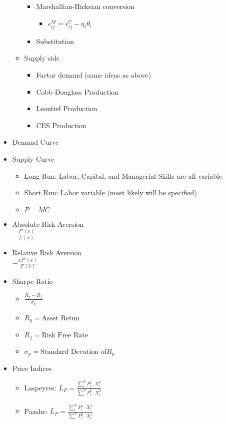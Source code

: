\begin{itemize}
\begin{itemize}
\begin{itemize}
\begin{itemize}
			\end{itemize}
			\item Marshallian-Hicksian conversion
			\begin{itemize}
				\item $\epsilon^M_{ij} = \epsilon^C_{ij} - \eta_i\theta_i$
			\end{itemize}
			\item Substitution
		\end{itemize}
		\item Supply side
		\begin{itemize}
			\item Factor demand (same ideas as above)
			\item Cobb-Douglass Production
			\item Leontief Production
			\item CES Production
		\end{itemize}
	\end{itemize}
	\item Demand Curve
	\item Supply Curve
	\begin{itemize}
		\item Long Run: Labor, Capital, and Managerial Skills are all variable
		\item Short Run: Labor variable (most likely will be specified)		
		\item $P = MC$
	\end{itemize}
		\item Absolute Risk Aversion\\
		$-\frac{f''(x)}{f'(x)}$
		\item Relative Risk Aversion\\
		$-\frac{xf''(x)}{f'(x)}$
		\item Sharpe Ratio
	\begin{itemize}
		\item $\frac{R_p - R_f}{\sigma_p}$
		\item $R_p = \text{Asset Retun}$
		\item $R_f = \text{Risk Free Rate}$
		\item $\sigma_p = \text{Standard Devation of} R_p$
	\end{itemize}
	\item Price Indices
	\begin{itemize}
		\item Laspeyres: $L_P = \frac{\sum_i^N P_i^1\cdot X_i^0}{\sum_i^N P_i^0\cdot X_i^0}$
		\item Paashe: $L_P = \frac{\sum_i^N P_i^1\cdot X_i^1}{\sum_i^N P_i^0\cdot X_i^1}$

\end{itemize}
\end{itemize}
